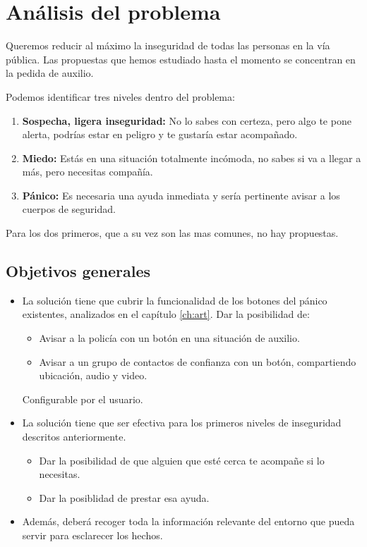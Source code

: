\chapter{Análisis del problema}
 
Queremos reducir al máximo la inseguridad de todas las personas en la vía pública.
Las propuestas que hemos estudiado hasta el momento se concentran en la pedida de auxilio.

Podemos identificar tres niveles dentro del problema:
\begin{enumerate}
  \item \textbf{Sospecha, ligera inseguridad:} No lo sabes con certeza, pero algo te pone alerta, podrías estar en peligro y te gustaría estar acompañado.
  \item \textbf{Miedo:} Estás en una situación totalmente incómoda, no sabes si va a llegar a más, pero necesitas compañía.
  \item \textbf{Pánico:} Es necesaria una ayuda inmediata y sería pertinente avisar a los cuerpos de seguridad.
\end{enumerate}

Para los dos primeros, que a su vez son las mas comunes, no hay propuestas.

\section{Objetivos generales}
\begin{itemize}
  \item La solución tiene que cubrir la funcionalidad de los botones del pánico existentes, analizados en el capítulo \ref{ch:art}.
  Dar la posibilidad de: 
  \begin{itemize}
    \item Avisar a la policía con un botón en una situación de auxilio.
    \item Avisar a un grupo de contactos de confianza con un botón, compartiendo ubicación, audio y video.
  \end{itemize}
  Configurable por el usuario.
  \item La solución tiene que ser efectiva para los primeros niveles de inseguridad descritos anteriormente.
  \begin{itemize}
    \item Dar la posibilidad de que alguien que esté cerca te acompañe si lo necesitas.
    \item Dar la posiblidad de prestar esa ayuda.
  \end{itemize}
  \item Además, deberá recoger toda la información relevante del entorno que pueda servir para esclarecer los hechos.
\end{itemize}